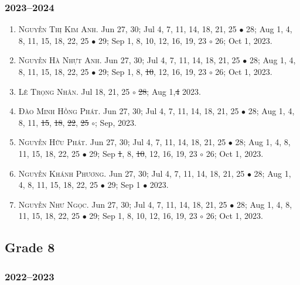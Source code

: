 \documentclass{article}
\begin{document}
\subsubsection{2023--2024}

\begin{enumerate}
	\item \textsc{Nguyễn Thị Kim Anh.} {\sf[In]} Jun 27, 30; Jul 4, 7, 11, 14, 18, 21, 25 $\bullet$ 28; Aug 1, 4, 8, 11, 15, 18, 22, 25 $\bullet$ 29; Sep 1, 8, 10, 12, 16, 19, 23 $\circ$ 26; Oct 1, 2023.
	\item \textsc{Nguyễn Hà Nhựt Anh.} {\sf[In]} Jun 27, 30; Jul 4, 7, 11, 14, 18, 21, 25 $\bullet$ 28; Aug 1, 4, 8, 11, 15, 18, 22, 25 $\bullet$ 29; Sep 1, 8, \st{10}, 12, 16, 19, 23 $\circ$ 26; Oct 1, 2023.
	\item \textsc{Lê Trọng Nhân.} {\sf[In]} Jul 18, 21, 25 $\circ$ \st{28}; Aug 1,\st{4} 2023. \sf{[Out]}
	\item \textsc{Đào Minh Hồng Phát.} {\sf[In]} Jun 27, 30; Jul 4, 7, 11, 14, 18, 21, 25 $\bullet$ 28; Aug 1, 4, 8, 11, \st{15}, \st{18}, \st{22}, \st{25} $\circ$; Sep, 2023. \sf{[Out]}
	\item \textsc{Nguyễn Hữu Phát.} {\sf[In]} Jun 27, 30; Jul 4, 7, 11, 14, 18, 21, 25 $\bullet$ 28; Aug 1, 4, 8, 11, 15, 18, 22, 25 $\bullet$ 29; Sep \st{1}, 8, \st{10}, 12, 16, 19, 23 $\circ$ 26; Oct 1, 2023.
	\item \textsc{Nguyễn Khánh Phương.} {\sf[In]} Jun 27, 30; Jul 4, 7, 11, 14, 18, 21, 25 $\bullet$ 28; Aug 1, 4, 8, 11, 15, 18, 22, 25 $\bullet$ 29; Sep 1 $\bullet$ 2023. \sf{[Out]}
	\item \textsc{Nguyễn Như Ngọc.} {\sf[In]} Jun 27, 30; Jul 4, 7, 11, 14, 18, 21, 25 $\bullet$ 28; Aug 1, 4, 8, 11, 15, 18, 22, 25 $\bullet$ 29; Sep 1, 8, 10, 12, 16, 19, 23 $\circ$ 26; Oct 1, 2023.
\end{enumerate}

\subsection{Grade 8}

\subsubsection{2022--2023}
\end{document}
